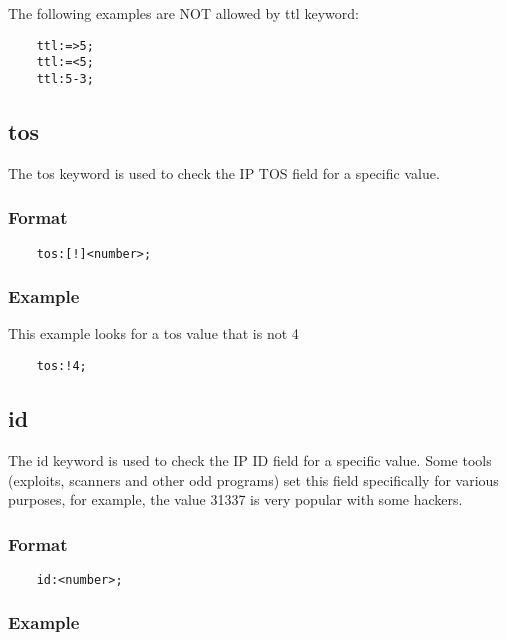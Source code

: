 \documentclass[english]{report}
\begin{document}
The following examples are NOT allowed by ttl keyword:

\begin{verbatim}
    ttl:=>5;
    ttl:=<5;
    ttl:5-3;
\end{verbatim}



\subsection{tos}

The tos keyword is used to check the IP TOS field for a specific value. 

\subsubsection{Format}

\begin{verbatim}
    tos:[!]<number>;
\end{verbatim}

\subsubsection{Example}

This example looks for a tos value that is not 4

\begin{verbatim}
    tos:!4;
\end{verbatim}

\subsection{id}

The id keyword is used to check the IP ID field for a specific value.  Some
tools (exploits, scanners and other odd programs) set this field specifically
for various purposes, for example, the value 31337 is very popular with some
hackers. 

\subsubsection{Format}

\begin{verbatim}
    id:<number>;
\end{verbatim}

\subsubsection{Example}
\end{document}

